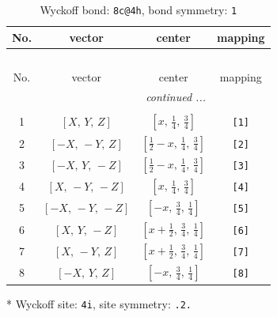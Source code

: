 \documentclass[fleqn,8pt]{jsarticle}
\begin{document}
\renewcommand{\arraystretch}{1.2}
\begin{longtable}{cccc}
\caption{Wyckoff bond: {\tt 8c@4h}, bond symmetry: {\tt 1}}
 \\
 \hline \hline
No. & vector & center & mapping \\ \hline \endfirsthead

\multicolumn{3}{l}{\tablename\ \thetable{}} \\
 \hline \hline
No. & vector & center & mapping \\ \hline \endhead

 \hline \hline
\multicolumn{3}{r}{\footnotesize\it continued ...} \\ \endfoot

 \hline \hline
\multicolumn{3}{r}{} \\ \endlastfoot

1 & $\left[ X,\, Y,\, Z \right]$ & $\left[ x,\, \frac{1}{4},\, \frac{3}{4} \right]$ & {\tt [1]} \\ \hline
2 & $\left[ - X,\, - Y,\, Z \right]$ & $\left[ \frac{1}{2} - x,\, \frac{1}{4},\, \frac{3}{4} \right]$ & {\tt [2]} \\ \hline
3 & $\left[ - X,\, Y,\, - Z \right]$ & $\left[ \frac{1}{2} - x,\, \frac{1}{4},\, \frac{3}{4} \right]$ & {\tt [3]} \\ \hline
4 & $\left[ X,\, - Y,\, - Z \right]$ & $\left[ x,\, \frac{1}{4},\, \frac{3}{4} \right]$ & {\tt [4]} \\ \hline
5 & $\left[ - X,\, - Y,\, - Z \right]$ & $\left[ - x,\, \frac{3}{4},\, \frac{1}{4} \right]$ & {\tt [5]} \\ \hline
6 & $\left[ X,\, Y,\, - Z \right]$ & $\left[ x + \frac{1}{2},\, \frac{3}{4},\, \frac{1}{4} \right]$ & {\tt [6]} \\ \hline
7 & $\left[ X,\, - Y,\, Z \right]$ & $\left[ x + \frac{1}{2},\, \frac{3}{4},\, \frac{1}{4} \right]$ & {\tt [7]} \\ \hline
8 & $\left[ - X,\, Y,\, Z \right]$ & $\left[ - x,\, \frac{3}{4},\, \frac{1}{4} \right]$ & {\tt [8]} \\
\end{longtable}
* Wyckoff site: {\tt 4i}, site symmetry: {\tt .2.}
\renewcommand{\arraystretch}{1.2}
\end{document}
